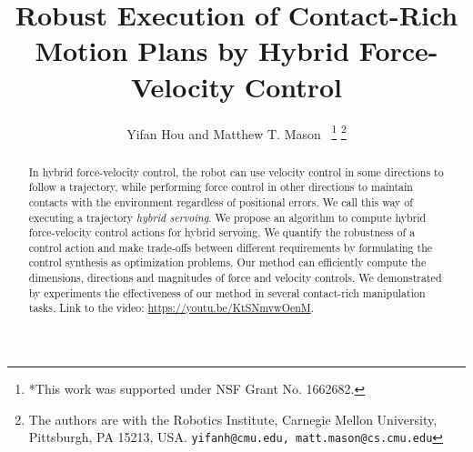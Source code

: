 \documentclass[letterpaper, 10 pt, conference]{ieeeconf}  %
\title{\vspace{-0cm}
\LARGE \bf
Robust Execution of Contact-Rich Motion Plans by Hybrid Force-Velocity Control
}
\author{Yifan Hou and Matthew T. Mason~\IEEEmembership{Fellow,~IEEE} %
\thanks{*This work was supported under NSF Grant No. 1662682. }%
\thanks{The authors are with the Robotics Institute, Carnegie Mellon University, Pittsburgh, PA 15213, USA.
        {\tt\small yifanh@cmu.edu, matt.mason@cs.cmu.edu}}
}
\begin{document}
\maketitle
\thispagestyle{empty}
\pagestyle{empty}


\begin{abstract}
In hybrid force-velocity control, the robot can use velocity control in some directions to follow a trajectory, while performing force control in other directions to maintain contacts with the environment regardless of positional errors. We call this way of executing a trajectory \textit{hybrid servoing}.
We propose an algorithm to compute hybrid force-velocity control actions for hybrid servoing. We quantify the robustness of a control action and make trade-offs between different requirements by formulating the control synthesis as optimization problems.
Our method can efficiently compute the dimensions, directions and magnitudes of force and velocity controls.
We demonstrated by experiments the effectiveness of our method in several contact-rich manipulation tasks.
Link to the video: \href{https://youtu.be/KtSNmvwOenM}{https://youtu.be/KtSNmvwOenM}.

\end{abstract}















\end{document}
